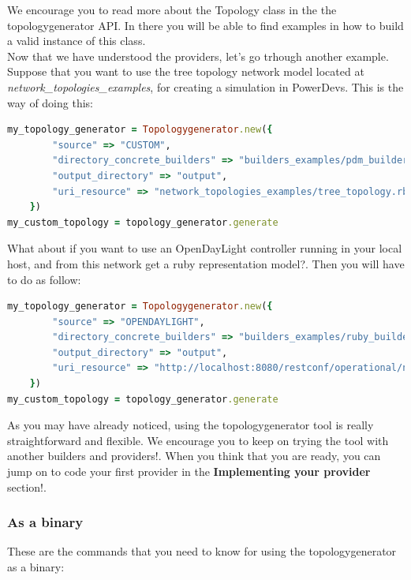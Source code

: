 We encourage you to read more about the Topology class in the the topologygenerator API. In there you will be able to find examples in how to build a valid instance of this class.\\

Now that we have understood the providers, let's go trhough another example. Suppose that you want to use the tree topology network model located at \textit{network\_topologies\_examples}, for creating a simulation in PowerDevs. This is the way of doing this:

\begin{lstlisting}[language=Ruby,breaklines=true]
my_topology_generator = Topologygenerator.new({
        "source" => "CUSTOM",
        "directory_concrete_builders" => "builders_examples/pdm_builders",
        "output_directory" => "output",
        "uri_resource" => "network_topologies_examples/tree_topology.rb" 
    })
my_custom_topology = topology_generator.generate
\end{lstlisting}

What about if you want to use an OpenDayLight controller running in your local host, and from this network get a ruby representation model?. Then you will have to do as follow:

\begin{lstlisting}[language=Ruby,breaklines=true]
my_topology_generator = Topologygenerator.new({
        "source" => "OPENDAYLIGHT",
        "directory_concrete_builders" => "builders_examples/ruby_builders",
        "output_directory" => "output",
        "uri_resource" => "http://localhost:8080/restconf/operational/network-topology:network-topology/topology/flow:1/" 
    }) 
my_custom_topology = topology_generator.generate
\end{lstlisting}

As you may have already noticed, using the topologygenerator tool is really straightforward and flexible. We encourage you to keep on trying the tool with another builders and providers!. When you think that you are ready, you can jump on to code your first provider in the \textbf{Implementing your provider} section!.

\subsubsection{As a binary}

These are the commands that you need to know for using the topologygenerator as a binary:


